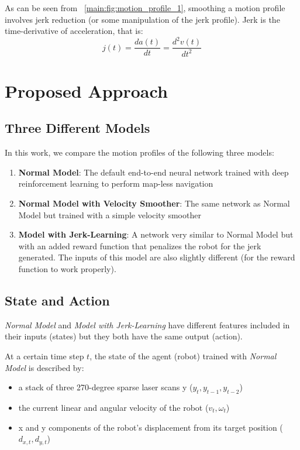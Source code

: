 As can be seen from ~\autoref{main:fig:motion_profile_1}, smoothing a motion profile involves jerk reduction (or some manipulation of the jerk profile). Jerk is the time-derivative of acceleration, that is:
\begin{equation}
j(t) = \frac{da(t)}{dt} = \frac{d^2 v(t)}{dt^2}
\end{equation}

\section{Proposed Approach}
\subsection{Three Different Models}
In this work, we compare the motion profiles of the following three models:
\begin{enumerate}
\item \textbf{Normal Model}: The default end-to-end neural network trained with deep reinforcement learning to perform map-less navigation
\item \textbf{Normal Model with Velocity Smoother}: The same network as Normal Model but trained with a simple velocity smoother
\item \textbf{Model with Jerk-Learning}: A network very similar to Normal Model but with an added reward function that penalizes the robot for the jerk generated. The inputs of this model are also slightly different (for the reward function to work properly).
\end{enumerate}

\subsection{State and Action}
\textit{Normal Model} and \textit{Model with Jerk-Learning} have different features included in their inputs (states) but they both have the same output (action).

At a certain time step $t$, the state of the agent (robot) trained with \textit{Normal Model} is described by:
\begin{itemize}
\item a stack of three 270-degree sparse laser scans y ($y_{t}, y_{t-1}, y_{t-2}$)
\item the current linear and angular velocity of the robot ($v_{t}, \omega_{t}$)
\item x and y components of the robot's displacement from its target position ($d_{x,t}, d_{y,t}$)
\end{itemize}

